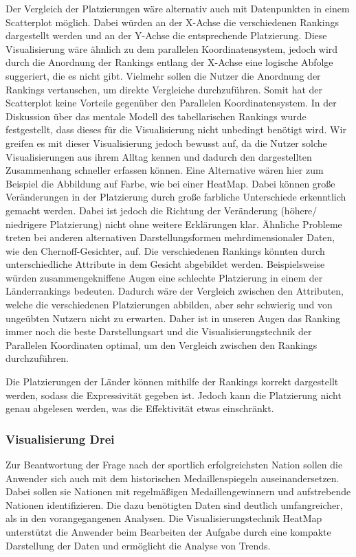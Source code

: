 Der Vergleich der Platzierungen wäre alternativ auch mit Datenpunkten in einem Scatterplot möglich. Dabei würden an der X-Achse die verschiedenen Rankings dargestellt werden und an der Y-Achse die entsprechende Platzierung. Diese Visualisierung wäre ähnlich zu dem parallelen Koordinatensystem, jedoch wird durch die Anordnung der Rankings entlang der X-Achse eine logische Abfolge suggeriert, die es nicht gibt. Vielmehr sollen die Nutzer die Anordnung der Rankings vertauschen, um direkte Vergleiche durchzuführen. Somit hat der Scatterplot keine Vorteile gegenüber den Parallelen Koordinatensystem. In der Diskussion über das mentale Modell des tabellarischen Rankings wurde festgestellt, dass dieses für die Visualisierung nicht unbedingt benötigt wird. Wir greifen es mit dieser Visualisierung jedoch bewusst auf, da die Nutzer solche Visualisierungen aus ihrem Alltag kennen und dadurch den dargestellten Zusammenhang schneller erfassen können. Eine Alternative wären hier zum Beispiel die Abbildung auf Farbe, wie bei einer HeatMap. Dabei können große Veränderungen in der Platzierung durch große farbliche Unterschiede erkenntlich gemacht werden. Dabei ist jedoch die Richtung der Veränderung (höhere/ niedrigere Platzierung) nicht ohne weitere Erklärungen klar. Ähnliche Probleme treten bei anderen alternativen Darstellungsformen mehrdimensionaler Daten, wie den Chernoff-Gesichter, auf. Die verschiedenen Rankings könnten durch unterschiedliche Attribute in dem Gesicht abgebildet werden. Beispielsweise würden zusammengekniffene Augen eine schlechte Platzierung in einem der Länderrankings bedeuten. Dadurch wäre der Vergleich zwischen den Attributen, welche die verschiedenen Platzierungen abbilden, aber sehr schwierig und von ungeübten Nutzern nicht zu erwarten. Daher ist in unseren Augen das Ranking immer noch die beste Darstellungsart und die Visualisierungstechnik der Parallelen Koordinaten optimal, um den Vergleich zwischen den Rankings durchzuführen.

Die Platzierungen der Länder können mithilfe der Rankings korrekt dargestellt werden, sodass die Expressivität gegeben ist. Jedoch kann die Platzierung nicht genau abgelesen werden, was die Effektivität etwas einschränkt.

\subsubsection{Visualisierung Drei}
Zur Beantwortung der Frage nach der sportlich erfolgreichsten Nation sollen die Anwender sich auch mit dem historischen Medaillenspiegeln auseinandersetzen. Dabei sollen sie Nationen mit regelmäßigen Medaillengewinnern und aufstrebende Nationen identifizieren. Die dazu benötigten Daten sind deutlich umfangreicher, als in den vorangegangenen Analysen. Die Visualisierungstechnik HeatMap unterstützt die Anwender beim Bearbeiten der Aufgabe durch eine kompakte Darstellung der Daten und ermöglicht die Analyse von Trends.

